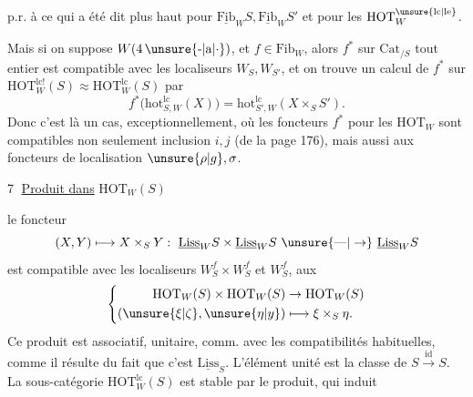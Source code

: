 p.r. à ce qui a été dit plus haut pour $\underline{\mathrm{Fib}}_W S,\underline{\mathrm{Fib}}_W S'$ et pour les $\mathrm{HOT}_W^{\unsure{\mathrm{lc}|\mathrm{le}}}$.

Mais si on suppose \uline{$W(4\,\unsure{\mbox{-}|\mathrm a|\cdot})$}, et \uline{$f\in\mathrm{Fib}_W$}, alors $f^*$ sur $\mathrm{Cat}_{/S}$ tout entier est compatible avec les localiseurs $W_S,W_{S'}$, et on trouve un calcul  de $f^*$ sur $\mathrm{HOT}_W^{\mathrm{lc}!}(S)\approx\mathrm{HOT}_W^{\mathrm{lc}}(S)$ par
\[
f^*\bigl(\mathrm{hot}^{\mathrm{lc}}_{S,W}(X)\bigr)=\mathrm{hot}^{\mathrm{lc}}_{S',W}(X\times_S S').
\]
Donc c'est là un cas, exceptionnellement, où les foncteurs $f^*$ pour les $\mathrm{HOT}_W$ sont compatibles non seulement  inclusion $i,j$ (de la page 176), mais aussi aux foncteurs de localisation $\unsure{\rho|g},\sigma$.


\textcircled{7} \uline{Produit  dans} $\mathrm{HOT}_W(S)$

 le foncteur
\[
(X,Y)\longmapsto X\times_S Y:\ \underline{\mathrm{Liss}}_W S\times\underline{\mathrm{Liss}}_W S\ \unsure{\text{---}|\to}\ \underline{\mathrm{Liss}}_W S
\]
est compatible avec les localiseurs $W_S^f\times W_S^f$ et $W_S^f$,   aux  
\[
\left\{\begin{aligned}
\mathrm{HOT}_W(S)\times\mathrm{HOT}_W(S)&\to\mathrm{HOT}_W(S)\\
(\unsure{\xi|\zeta},\unsure{\eta|y})&\longmapsto\xi\times_S\eta .
\end{aligned}\right.
\]
Ce produit est associatif, unitaire, comm. avec  les compatibilités habituelles, comme il résulte du fait que c'est   $\underline{\mathrm{Liss}}_S$. L'élément unité est la classe de $S\xrightarrow{\mathrm{id}}S$. La sous-catégorie $\mathrm{HOT}_W^{\mathrm{lc}}(S)$ est stable par le produit, qui induit

